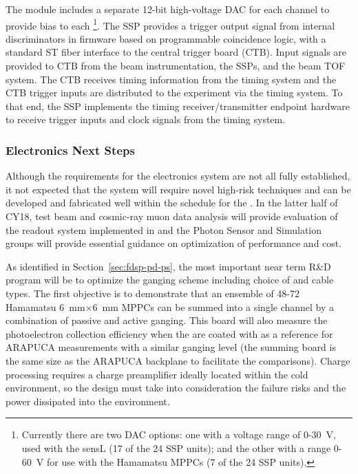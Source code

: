 The module includes a separate \num{12}-bit high-voltage DAC for each channel to provide bias to each \footnote{Currently there are two DAC options: one with a voltage range of \num{0}-\SI{30}{V}, used with the sensL  (17 of the 24 SSP units); and the other with a range \num{0}-\SI{60}{V} for use with the Hamamatsu MPPCs (7 of the 24 SSP units). }. The SSP provides a trigger output signal from internal discriminators in firmware based on programmable coincidence logic, with a standard ST fiber interface to the central trigger board (CTB).
Input signals are provided to CTB from the beam instrumentation, the SSPs, and the beam TOF system. The CTB receives timing information from 
the  timing system and the CTB trigger inputs are distributed to the experiment via the timing system.
To that end, the SSP implements the timing receiver/transmitter endpoint hardware to receive trigger inputs and clock signals from the timing system.


\subsubsection{Electronics Next Steps}

Although the requirements for the electronics system are not all fully established, it not expected that the system will require novel high-risk techniques and can be developed and fabricated well within the schedule for the .
In the latter half of CY18,  test beam and cosmic-ray muon data analysis will provide evaluation of the readout system implemented in  and the  Photon Sensor and Simulation groups will provide essential guidance on optimization of performance and cost.

As identified in Section~\ref{sec:fdsp-pd-ps}, the most important near term R\&D program will be to optimize the ganging scheme including choice of  and cable types. 
The first objective is to demonstrate that an ensemble of 48-72 Hamamatsu \SI{6}{mm}$\times$\SI{6}{mm} MPPCs can be summed into a single channel by a combination of passive and active ganging. This board will also measure the photoelectron collection efficiency when the  are coated with  as a reference for ARAPUCA measurements with a similar ganging level (the summing  board is the same size as the  ARAPUCA backplane to facilitate the comparisons).
Charge processing requires a charge preamplifier ideally located within the cold environment, so the design must take into consideration the failure risks and the power dissipated into the environment.

